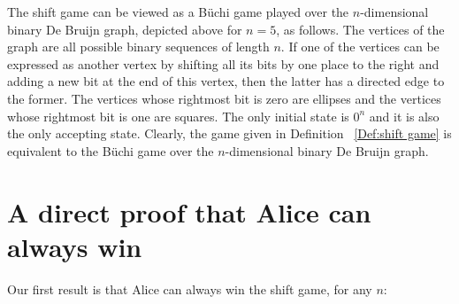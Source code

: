 \documentclass[final,12pt]{elsarticle}
\theoremstyle{definition} \newtheorem{definition}[theorem]{Definition} \newtheorem{observation}[theorem]{Observation} \newtheorem{example}[theorem]{Example} \newtheorem{remark}[theorem]{Remark} \newtheorem{corrolary}[theorem]{Corrolary}
\begin{document}
The shift game can be viewed as a B\"uchi game played over the $n$-dimensional binary De Bruijn graph, depicted above for $n=5$, as follows. The vertices of the graph are all possible binary sequences of length $n$. If one of the vertices can be expressed as another vertex by shifting all its bits by one place to the right and adding a new bit at the end of this vertex, then the latter has a directed edge to the former. The vertices whose rightmost bit is zero are ellipses and the vertices whose rightmost bit is one are squares. The only initial state is $0^n$ and it is also the only accepting state. Clearly, the game given in Definition~   \ref{Def:shift game} is equivalent to the B\"uchi game over the $n$-dimensional binary De Bruijn graph.

\section{A direct proof that Alice can always win} 
\label{sec:alice-wins}
Our first result is that Alice can always win the shift game, for any $n$:
\end{document}
